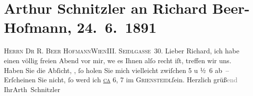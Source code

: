 

         
         \renewcommand{\erwaehntePersonen}{Personen: Richard Beer-Hofmann, Felix Salten}
         \renewcommand{\erwaehnteOrte}{Orte: Café Griensteidl, Seidlgasse, Türkenschanzpark, Wien}
         \renewcommand{\erwaehnteWerke}{}
               \section[Arthur Schnitzler an Richard Beer-Hofmann, 24. 6. 1891]{ Arthur Schnitzler an Richard Beer-Hofmann,
               24. 6. 1891}\nopagebreak{}\rehead{ }\begin{ledgroupsized}[t]{13cm}\normalsize\beginnumbering \toendnotes[C]{\smallbreak\pagebreak[2]} 
\toendnotes[C]{\smallbreak}\pstart{}{\pb}\textsc{Herrn Dr R. Beer Hofmann}\pend{}\pstart{}\textsc{Wien}\pend{}\pstart{}\textsc{III. Seidlgasse 30}. \pend{}{\bigskip}\pstart
           \noindent{}{\pb}Lieber Richard, ich habe einen völlig freien Abend vor mir, we{\geminationn} es Ihnen alſo recht iſt, treffen wir uns. Haben Sie
               die Abſicht, \label{K_L00021_1v}\label{K_L00021_1h}, ſo holen Sie mich
               vielleicht zwiſchen 5 u ½ 6 ab – Erſcheinen Sie nicht, ſo
               werd ich \uline{\textsc{ca}}{ }6, 7 im \textsc{Griensteidl}ſein.\pend
           \pstart Herzlich grüß\textcolor{gray}{end} Ihr\spacefill\mbox{Arth Schnitzler}\pend{}
         
         \endnumbering{}\end{ledgroupsized}  \newcommand{\dateiname}{L00021}\newcommand{\titel}{Arthur Schnitzler an Richard Beer-Hofmann, 24. 6. 1891}\newcommand{\editorInnen}{Martin Anton Müller und Gerd-Hermann Susen}
      